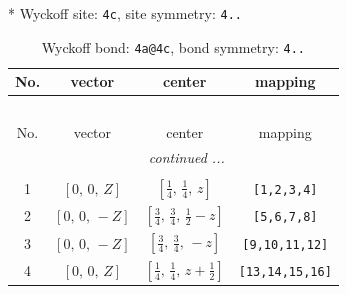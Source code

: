 \documentclass[fleqn,8pt]{jsarticle}
\begin{document}
* Wyckoff site: {\tt 4c}, site symmetry: {\tt 4..}
\renewcommand{\arraystretch}{1.2}
\begin{longtable}{cccc}
\caption{Wyckoff bond: {\tt 4a@4c}, bond symmetry: {\tt 4..}}
 \\
 \hline \hline
No. & vector & center & mapping \\ \hline \endfirsthead

\multicolumn{3}{l}{\tablename\ \thetable{}} \\
 \hline \hline
No. & vector & center & mapping \\ \hline \endhead

 \hline \hline
\multicolumn{3}{r}{\footnotesize\it continued ...} \\ \endfoot

 \hline \hline
\multicolumn{3}{r}{} \\ \endlastfoot

1 & $\left[ 0,\, 0,\, Z \right]$ & $\left[ \frac{1}{4},\, \frac{1}{4},\, z \right]$ & {\tt [1,2,3,4]} \\ \hline
2 & $\left[ 0,\, 0,\, - Z \right]$ & $\left[ \frac{3}{4},\, \frac{3}{4},\, \frac{1}{2} - z \right]$ & {\tt [5,6,7,8]} \\ \hline
3 & $\left[ 0,\, 0,\, - Z \right]$ & $\left[ \frac{3}{4},\, \frac{3}{4},\, - z \right]$ & {\tt [9,10,11,12]} \\ \hline
4 & $\left[ 0,\, 0,\, Z \right]$ & $\left[ \frac{1}{4},\, \frac{1}{4},\, z + \frac{1}{2} \right]$ & {\tt [13,14,15,16]} \\
\end{longtable}
\renewcommand{\arraystretch}{1.2}
\end{document}
